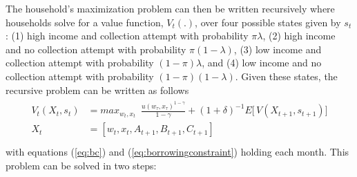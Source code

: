 \documentclass[12pt]{article}
\begin{document}
The household's maximization problem can then be written recursively where households solve for a value function, $V_t(.)$, over four possible states given by $s_{t}$: (1) high income and collection attempt with probability $\pi\lambda$, (2) high income and no collection attempt with probability $\pi(1-\lambda)$, (3) low income and collection attempt with probability $(1-\pi)\lambda$, and (4) low income and no collection attempt with probability $(1-\pi)(1-\lambda)$.  Given these states, the recursive problem can be written as follows
\begin{align*}
\begin{split}
V_t(X_{t},s_t) &= max_{w_t,x_{t}} \,\,\, \frac{u(w_{\tau},x_{\tau})^{1-\gamma}}{1-\gamma}   + (1+\delta)^{-1}  E \Big[\, V(X_{t+1},s_{t+1})\Big] \\
X_t &= [w_t,x_t,A_{t+1},B_{t+1},C_{t+1}] \\
\end{split}
\end{align*}
with equations (\ref{eq:bc}) and (\ref{eq:borrowingconstraint}) holding each month.  This problem can be solved in two steps: 

\end{document}
